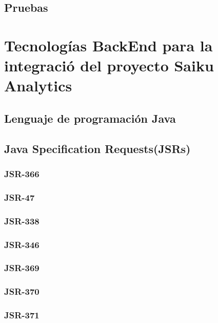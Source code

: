\begin{spacing}{1.5}
	\subsection{Pruebas}
				\lipsum[1]
\section{Tecnolog\'{i}as BackEnd para la integraci\'{o} del proyecto Saiku Analytics}
		\lipsum[1-2]
	\subsection{Lenguaje de programaci\'{o}n Java}
			\lipsum[1-2]
	\subsection{Java Specification Requests(JSRs)}
		\subsubsection{JSR-366}
				\lipsum[1-2]
		\subsubsection{JSR-47}
				\lipsum[1-2]
		\subsubsection{JSR-338}
				\lipsum[1-2]
		\subsubsection{JSR-346}
				\lipsum[1-2]
		\subsubsection{JSR-369}
				\lipsum[1-2]
		\subsubsection{JSR-370}
		\lipsum[1-2]
		\subsubsection{JSR-371}
		\lipsum[1-2]

\end{spacing}
